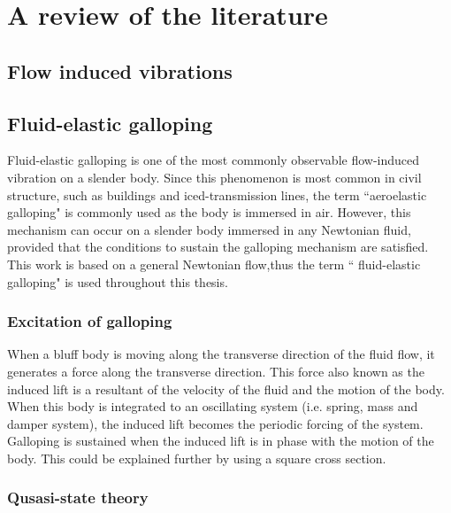 \chapter{A review of the literature}

\section{Flow induced vibrations}


\section{Fluid-elastic galloping}

Fluid-elastic galloping is one of the most commonly observable flow-induced vibration on a slender body. Since this phenomenon is most common in civil structure, such as buildings and iced-transmission lines, the term ``aeroelastic galloping" is commonly used as the body is immersed in air. However, this mechanism can occur on a slender body immersed in any Newtonian fluid, provided that the conditions to sustain the galloping mechanism are satisfied. This work is based on a general Newtonian flow,thus the term `` fluid-elastic galloping" is used throughout this thesis.
   

\subsection{Excitation of galloping}

When a bluff body is moving along the transverse direction of the fluid flow, it generates a force along the transverse direction. This force also known as the induced lift is a resultant of the velocity of the fluid and the motion of the body. When this body is integrated to an oscillating system (i.e. spring, mass and damper system), the induced lift becomes the periodic forcing of the system. Galloping is sustained when the induced lift is in phase with the motion of the body. This could be explained further by using a square cross section. 






\subsection{Qusasi-state theory}

